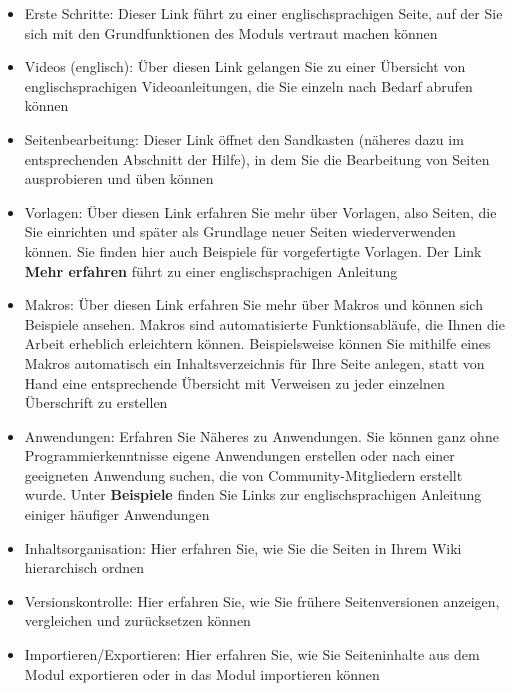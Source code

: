\documentclass[
  letterpaper,
  DIV=11,
  numbers=noendperiod]{scrreprt}
\providecommand{\tightlist}{%
  \setlength{\itemsep}{0pt}\setlength{\parskip}{0pt}}\usepackage{longtable,booktabs,array}
\begin{document}
\begin{itemize}
\tightlist
\item
  Erste Schritte: Dieser Link führt zu einer englischsprachigen Seite,
  auf der Sie sich mit den Grundfunktionen des Moduls vertraut machen
  können
\item
  Videos (englisch): Über diesen Link gelangen Sie zu einer Übersicht
  von englischsprachigen Videoanleitungen, die Sie einzeln nach Bedarf
  abrufen können
\item
  Seitenbearbeitung: Dieser Link öffnet den Sandkasten (näheres dazu im
  entsprechenden Abschnitt der Hilfe), in dem Sie die Bearbeitung von
  Seiten ausprobieren und üben können
\item
  Vorlagen: Über diesen Link erfahren Sie mehr über Vorlagen, also
  Seiten, die Sie einrichten und später als Grundlage neuer Seiten
  wiederverwenden können. Sie finden hier auch Beispiele für
  vorgefertigte Vorlagen. Der Link \textbf{Mehr erfahren} führt zu einer
  englischsprachigen Anleitung
\item
  Makros: Über diesen Link erfahren Sie mehr über Makros und können sich
  Beispiele ansehen. Makros sind automatisierte Funktionsabläufe, die
  Ihnen die Arbeit erheblich erleichtern können. Beispielsweise können
  Sie mithilfe eines Makros automatisch ein Inhaltsverzeichnis für Ihre
  Seite anlegen, statt von Hand eine entsprechende Übersicht mit
  Verweisen zu jeder einzelnen Überschrift zu erstellen
\item
  Anwendungen: Erfahren Sie Näheres zu Anwendungen. Sie können ganz ohne
  Programmierkenntnisse eigene Anwendungen erstellen oder nach einer
  geeigneten Anwendung suchen, die von Community-Mitgliedern erstellt
  wurde. Unter \textbf{Beispiele} finden Sie Links zur
  englischsprachigen Anleitung einiger häufiger Anwendungen
\item
  Inhaltsorganisation: Hier erfahren Sie, wie Sie die Seiten in Ihrem
  Wiki hierarchisch ordnen
\item
  Versionskontrolle: Hier erfahren Sie, wie Sie frühere Seitenversionen
  anzeigen, vergleichen und zurücksetzen können
\item
  Importieren/Exportieren: Hier erfahren Sie, wie Sie Seiteninhalte aus
  dem Modul exportieren oder in das Modul importieren können
\end{itemize}
\end{document}
